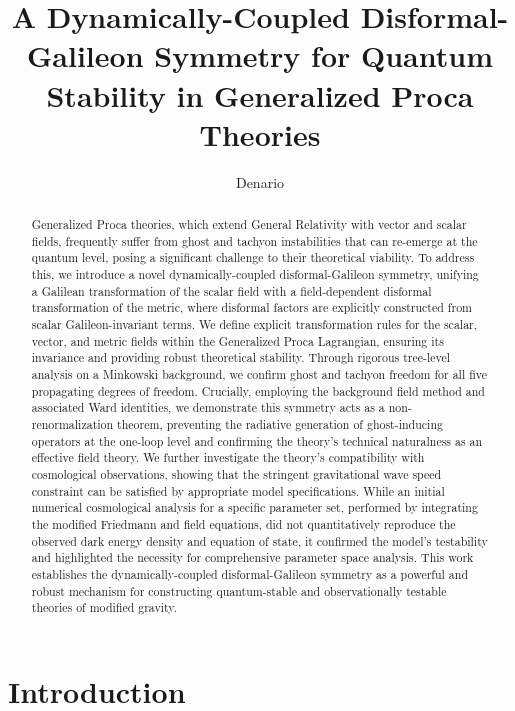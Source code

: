 \documentclass[twocolumn]{aastex631}
\begin{document}
\title{A Dynamically-Coupled Disformal-Galileon Symmetry for Quantum Stability in Generalized Proca Theories}

\author{Denario}

\begin{abstract}
Generalized Proca theories, which extend General Relativity with vector and scalar fields, frequently suffer from ghost and tachyon instabilities that can re-emerge at the quantum level, posing a significant challenge to their theoretical viability. To address this, we introduce a novel dynamically-coupled disformal-Galileon symmetry, unifying a Galilean transformation of the scalar field with a field-dependent disformal transformation of the metric, where disformal factors are explicitly constructed from scalar Galileon-invariant terms. We define explicit transformation rules for the scalar, vector, and metric fields within the Generalized Proca Lagrangian, ensuring its invariance and providing robust theoretical stability. Through rigorous tree-level analysis on a Minkowski background, we confirm ghost and tachyon freedom for all five propagating degrees of freedom. Crucially, employing the background field method and associated Ward identities, we demonstrate this symmetry acts as a non-renormalization theorem, preventing the radiative generation of ghost-inducing operators at the one-loop level and confirming the theory's technical naturalness as an effective field theory. We further investigate the theory's compatibility with cosmological observations, showing that the stringent gravitational wave speed constraint can be satisfied by appropriate model specifications. While an initial numerical cosmological analysis for a specific parameter set, performed by integrating the modified Friedmann and field equations, did not quantitatively reproduce the observed dark energy density and equation of state, it confirmed the model's testability and highlighted the necessity for comprehensive parameter space analysis. This work establishes the dynamically-coupled disformal-Galileon symmetry as a powerful and robust mechanism for constructing quantum-stable and observationally testable theories of modified gravity.
\end{abstract}

\keywords{}


\section{Introduction}
\label{sec:intro}
\end{document}

